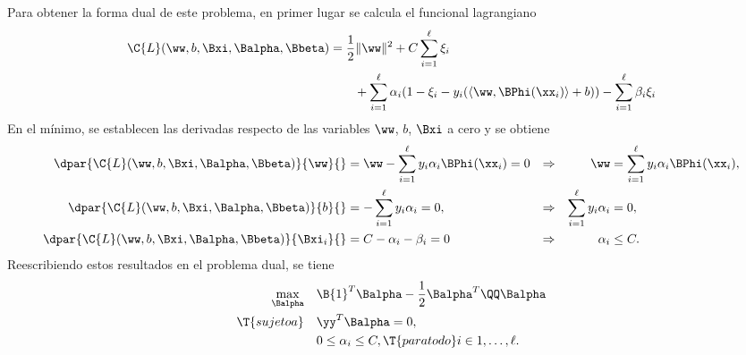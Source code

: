 %
%
%
%
Para obtener la forma dual de este problema, en primer lugar se
calcula el funcional lagrangiano
%
\begin{equation}
  \begin{aligned}
    \C{L}(\ww,b,\Bxi,\Balpha,\Bbeta) &= \frac{1}{2} \|\ww\|^2
        + C \sum_{i=1}^{\ell} \xi_i \\
    &\quad\quad
        + \sum_{i=1}^{\ell} \alpha_i (1-\xi_i-y_i(\langle\ww,\BPhi(\xx_i)\rangle+b))
        - \sum_{i=1}^{\ell} \beta_i\xi_i
  \end{aligned}
\end{equation}
%
En el mínimo, se establecen las derivadas respecto de las variables
$\ww$, $b$, $\Bxi$ a cero y se obtiene
%
\begin{align}
  \dpar{ \C{L}(\ww,b,\Bxi,\Balpha,\Bbeta)}{\ww}{}
    &=\ww-\sum_{i=1}^\ell y_i\alpha_i\BPhi(\xx_i) = 0
    &\Rightarrow&& \ww &= \sum_{i=1}^\ell y_i\alpha_i\BPhi(\xx_i),
  \\
  \dpar{ \C{L}(\ww,b,\Bxi,\Balpha,\Bbeta)}{b}{}
    &=-\sum_{i=1}^\ell y_i\alpha_i = 0,
    &\Rightarrow&& \sum_{i=1}^\ell y_i\alpha_i &= 0,
  \\
  \dpar{ \C{L}(\ww,b,\Bxi,\Balpha,\Bbeta)}{\Bxi_i}{}
    &=C-\alpha_i-\beta_i = 0
    &\Rightarrow&& \alpha_i &\leq C.
\end{align}
%
Reescribiendo estos resultados en el problema dual, se tiene
%
\begin{equation}
\begin{aligned}\label{svmprob-dual-soft}
    \max_{\Balpha} \quad
    & \B{1}^T\Balpha-\frac{1}{2}\Balpha^T\QQ\Balpha\\
    \T{sujeto a}\quad & \yy^T\Balpha = 0, \\
                      & 0\leq\alpha_i\leq C, \T{ para todo } i\in {1,\ldots,\ell }.
\end{aligned}\end{equation}
